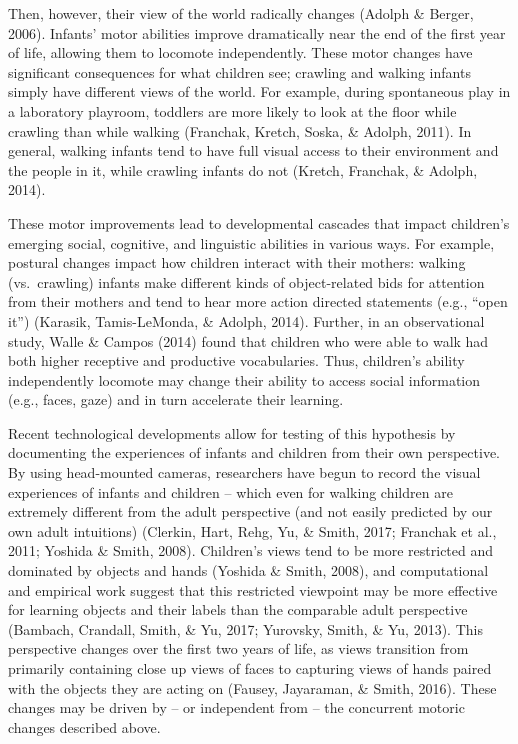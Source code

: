 \documentclass[10pt, letterpaper]{article}
\begin{document}
Then, however, their view of the world radically changes (Adolph \&
Berger, 2006). Infants' motor abilities improve dramatically near the
end of the first year of life, allowing them to locomote independently.
These motor changes have significant consequences for what children see;
crawling and walking infants simply have different views of the world.
For example, during spontaneous play in a laboratory playroom, toddlers
are more likely to look at the floor while crawling than while walking
(Franchak, Kretch, Soska, \& Adolph, 2011). In general, walking infants
tend to have full visual access to their environment and the people in
it, while crawling infants do not (Kretch, Franchak, \& Adolph, 2014).

These motor improvements lead to developmental cascades that impact
children's emerging social, cognitive, and linguistic abilities in
various ways. For example, postural changes impact how children interact
with their mothers: walking (vs.~crawling) infants make different kinds
of object-related bids for attention from their mothers and tend to hear
more action directed statements (e.g., ``open it'') (Karasik,
Tamis-LeMonda, \& Adolph, 2014). Further, in an observational study,
Walle \& Campos (2014) found that children who were able to walk had
both higher receptive and productive vocabularies. Thus, children's
ability independently locomote may change their ability to access social
information (e.g., faces, gaze) and in turn accelerate their learning.

Recent technological developments allow for testing of this hypothesis
by documenting the experiences of infants and children from their own
perspective. By using head-mounted cameras, researchers have begun to
record the visual experiences of infants and children -- which even for
walking children are extremely different from the adult perspective (and
not easily predicted by our own adult intuitions) (Clerkin, Hart, Rehg,
Yu, \& Smith, 2017; Franchak et al., 2011; Yoshida \& Smith, 2008).
Children's views tend to be more restricted and dominated by objects and
hands (Yoshida \& Smith, 2008), and computational and empirical work
suggest that this restricted viewpoint may be more effective for
learning objects and their labels than the comparable adult perspective
(Bambach, Crandall, Smith, \& Yu, 2017; Yurovsky, Smith, \& Yu, 2013).
This perspective changes over the first two years of life, as views
transition from primarily containing close up views of faces to
capturing views of hands paired with the objects they are acting on
(Fausey, Jayaraman, \& Smith, 2016). These changes may be driven by --
or independent from -- the concurrent motoric changes described above.
\end{document}
